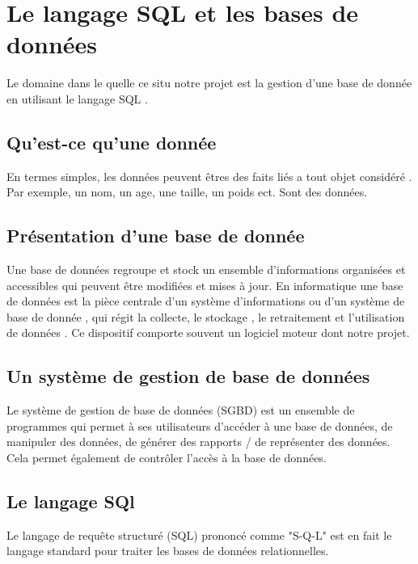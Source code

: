 \documentclass[oneside,13pt,a4paper]{report}
\begin{document}
    \chapter{Le langage SQL et les bases de données}

        Le domaine dans le quelle ce situ notre projet est la gestion d’une base de donnée en utilisant le langage SQL .

        \section{Qu’est-ce qu’une donnée}

            En termes simples, les données peuvent êtres des faits liés a tout objet considéré .
            Par exemple, un nom, un age, une taille, un poids ect. Sont des données.

        \section{Présentation d’une base de donnée}

            Une base de données regroupe et stock un ensemble d’informations organisées et accessibles qui peuvent être modifiées et mises à jour. En informatique une base de données est la pièce centrale d’un système d’informations ou d’un système de base de donnée , qui régit la collecte, le stockage , le retraitement et l’utilisation de données . Ce dispositif comporte souvent un logiciel moteur dont notre projet.

        \section{Un système de gestion de base de données}

            Le système de gestion de base de données (SGBD) est un ensemble de programmes qui permet à ses utilisateurs d'accéder à une base de données, de manipuler des données, de générer des rapports / de représenter des données.
            Cela permet également de contrôler l'accès à la base de données.

        \section{Le langage SQl}

            Le langage de requête structuré (SQL) prononcé comme "S-Q-L" est en fait le langage standard pour traiter les bases de données relationnelles.
\end{document}
